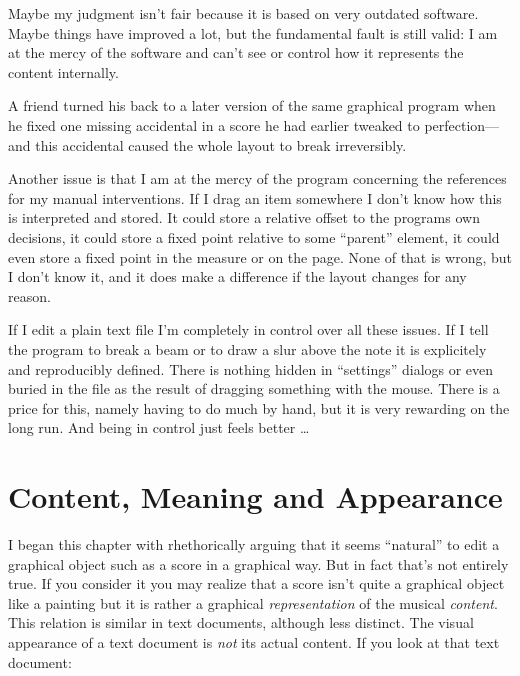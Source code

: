 \documentclass[../../LilyPond-Tutorials]{subfiles}
\begin{document}
Maybe my judgment isn't fair because it is based on very outdated software.
Maybe things have improved a lot, but the fundamental fault is still valid: 
I am at the mercy of the software and can't see or control how it represents the content internally.

A friend turned his back to a later version of the same graphical program when he fixed one missing accidental in a score he had earlier tweaked to perfection---and this accidental caused the whole layout to break irreversibly.

Another issue is that I am at the mercy of the program concerning the references for my manual interventions.
If I drag an item somewhere I don't know how this is interpreted and stored.
It could store a relative offset to the programs own decisions, it could store a fixed point relative to some “parent” element, it could even store a fixed point in the measure or on the page.
None of that is wrong, but I don't know it, and it does make a difference if the layout changes for any reason.

\medskip
If I edit a plain text file I'm completely in control over all these issues.
If I tell the program to break a beam or to draw a slur above the note it is explicitely and reproducibly defined.
There is nothing hidden in “settings” dialogs or even buried in the file as the result of dragging something with the mouse.
There is a price for this, namely having to do much by hand, but it is very rewarding on the long run.
And being in control just feels better \dots

\section*{Content, Meaning and Appearance}
I began this chapter with rhethorically arguing that it seems “natural” to edit a graphical object such as a score in a graphical way.
But in fact that's not entirely true.
If you consider it you may realize that a score isn't quite a graphical object like a painting
but it is rather a graphical \emph{representation} of the musical \emph{content}.
This relation is similar in text documents, although less distinct.
The visual appearance of a text document is \emph{not} its actual content.
If you look at that text document:

\begin{center}
\noindent{}\end{center}
\end{document}
